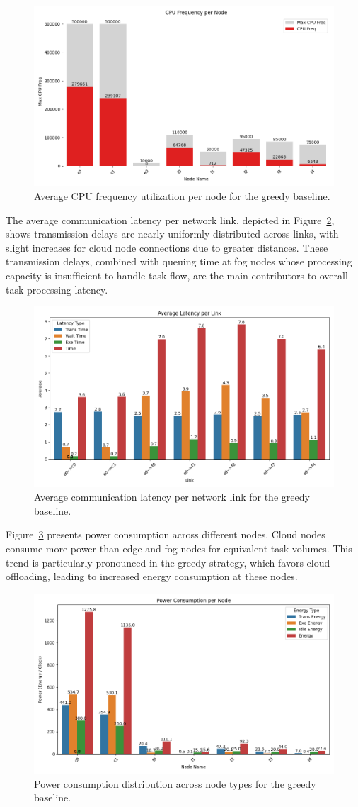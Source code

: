 \documentclass[preprint,3p,authoryear]{elsarticle}
\begin{document}
\begin{figure}[H]
    \centering
    \includegraphics[width=0.5\linewidth]{figs/Greedy/cpu_frequency_per_node.png}
    \caption{Average CPU frequency utilization per node for the greedy baseline.}
    \label{fig:greedy-cpu-freq}
\end{figure}

The average communication latency per network link, depicted in Figure~\ref{fig:greedy-avg-latency}, shows transmission delays are nearly uniformly distributed across links, with slight increases for cloud node connections due to greater distances. These transmission delays, combined with queuing time at fog nodes whose processing capacity is insufficient to handle task flow, are the main contributors to overall task processing latency.

\begin{figure}[H]
    \centering
    \includegraphics[width=0.5\linewidth]{figs/Greedy/avg_latency_per_link.png}
    \caption{Average communication latency per network link for the greedy baseline.}
    \label{fig:greedy-avg-latency}
\end{figure}

Figure~\ref{fig:greedy-power-consumption} presents power consumption across different nodes. Cloud nodes consume more power than edge and fog nodes for equivalent task volumes. This trend is particularly pronounced in the greedy strategy, which favors cloud offloading, leading to increased energy consumption at these nodes.

\begin{figure}[H]
    \centering
    \includegraphics[width=0.5\linewidth]{figs/Greedy/power_consumption_per_node.png}
    \caption{Power consumption distribution across node types for the greedy baseline.}
    \label{fig:greedy-power-consumption}
\end{figure}
\end{document}
